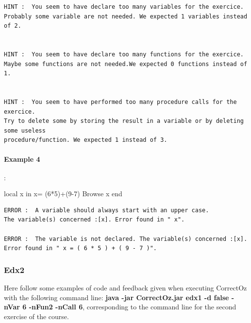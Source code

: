 \documentclass[11pt,a4paper,twoside,openright]{report}
\begin{document}
\begin{lstlisting}
HINT :  You seem to have declare too many variables for the exercice. 
Probably some variable are not needed. We expected 1 variables instead of 2.


HINT :  You seem to have declare too many functions for the exercice. 
Maybe some functions are not needed.We expected 0 functions instead of 1.


HINT :  You seem to have performed too many procedure calls for the exercice. 
Try to delete some by storing the result in a variable or by deleting some useless 
procedure/function. We expected 1 instead of 3.
\end{lstlisting}

%
%	
%

\paragraph{Example 4}:

\begin{OZ}
local x in 
	x= (6*5)+(9-7)
	{Browse x}
end
\end{OZ}

\begin{lstlisting}
ERROR :  A variable should always start with an upper case. 
The variable(s) concerned :[x]. Error found in " x".

ERROR :  The variable is not declared. The variable(s) concerned :[x]. 
Error found in " x = ( 6 * 5 ) + ( 9 - 7 )".
\end{lstlisting}


\subsubsection{Edx2}
Here follow some examples of code and feedback given when executing 
CorrectOz with the following command line: \textbf{java -jar CorrectOz.jar edx1 -d 
false -nVar 6 -nFun2 -nCall 6}, corresponding to the command line for the 
second exercise of the course.
\end{document}
